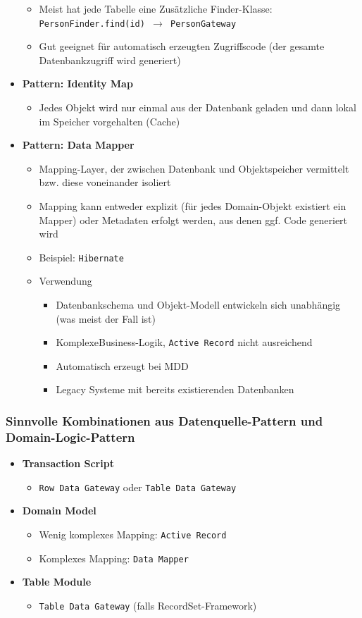 \begin{itemize}
\begin{itemize}
		\item Meist hat jede Tabelle eine Zusätzliche Finder-Klasse: \texttt{PersonFinder.find(id) \(\rightarrow\) PersonGateway}
		\item Gut geeignet für automatisch erzeugten Zugriffscode (der gesamte Datenbankzugriff wird generiert)
	\end{itemize}
	\item \textbf{Pattern: Identity Map}
	\begin{itemize}
		\item Jedes Objekt wird nur einmal aus der Datenbank geladen und dann lokal im Speicher vorgehalten (Cache)
	\end{itemize}
	\item \textbf{Pattern: Data Mapper}
	\begin{itemize}
		\item Mapping-Layer, der zwischen Datenbank und Objektspeicher vermittelt bzw. diese voneinander isoliert
		\item Mapping kann entweder explizit (für jedes Domain-Objekt existiert ein Mapper) oder Metadaten erfolgt werden, aus denen ggf. Code generiert wird
		\item Beispiel: \texttt{Hibernate}
		\item Verwendung
		\begin{itemize}
			\item Datenbankschema und Objekt-Modell entwickeln sich unabhängig (was meist der Fall ist)
			\item KomplexeBusiness-Logik, \texttt{Active Record} nicht ausreichend
			\item Automatisch erzeugt bei MDD
			\item Legacy Systeme mit bereits existierenden Datenbanken
		\end{itemize}
	\end{itemize}
\end{itemize}

\subsubsection{Sinnvolle Kombinationen aus Datenquelle-Pattern und Domain-Logic-Pattern}
\begin{itemize}
	\item \textbf{Transaction Script}
	\begin{itemize}
		\item \texttt{Row Data Gateway} oder \texttt{Table Data Gateway}
	\end{itemize}
	\item \textbf{Domain Model}
	\begin{itemize}
		\item Wenig komplexes Mapping: \texttt{Active Record}
		\item Komplexes Mapping: \texttt{Data Mapper}
	\end{itemize}
	\item \textbf{Table Module}
	\begin{itemize}
		\item \texttt{Table Data Gateway} (falls RecordSet-Framework)
	\end{itemize}
\end{itemize}

